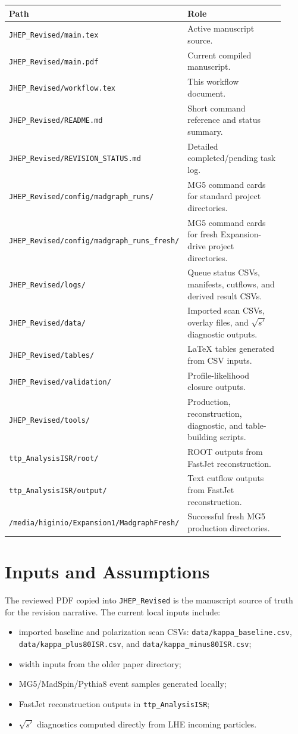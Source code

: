 \documentclass[11pt]{article}
\newcommand{\rev}{\texttt{JHEP\_Revised}}
\begin{document}
\begin{longtable}{@{}p{0.34\linewidth}p{0.58\linewidth}@{}}
\toprule
Path & Role \\
\midrule
\endhead
\texttt{JHEP\_Revised/main.tex} & Active manuscript source. \\
\texttt{JHEP\_Revised/main.pdf} & Current compiled manuscript. \\
\texttt{JHEP\_Revised/workflow.tex} & This workflow document. \\
\texttt{JHEP\_Revised/README.md} & Short command reference and status summary. \\
\texttt{JHEP\_Revised/REVISION\_STATUS.md} & Detailed completed/pending task log. \\
\texttt{JHEP\_Revised/config/madgraph\_runs/} & MG5 command cards for standard project directories. \\
\texttt{JHEP\_Revised/config/madgraph\_runs\_fresh/} & MG5 command cards for fresh Expansion-drive project directories. \\
\texttt{JHEP\_Revised/logs/} & Queue status CSVs, manifests, cutflows, and derived result CSVs. \\
\texttt{JHEP\_Revised/data/} & Imported scan CSVs, overlay files, and $\sqrt{s'}$ diagnostic outputs. \\
\texttt{JHEP\_Revised/tables/} & LaTeX tables generated from CSV inputs. \\
\texttt{JHEP\_Revised/validation/} & Profile-likelihood closure outputs. \\
\texttt{JHEP\_Revised/tools/} & Production, reconstruction, diagnostic, and table-building scripts. \\
\texttt{ttp\_AnalysisISR/root/} & ROOT outputs from FastJet reconstruction. \\
\texttt{ttp\_AnalysisISR/output/} & Text cutflow outputs from FastJet reconstruction. \\
\texttt{/media/higinio/Expansion1/MadgraphFresh/} & Successful fresh MG5 production directories. \\
\bottomrule
\end{longtable}

\section{Inputs and Assumptions}

The reviewed PDF copied into \rev{} is the manuscript source of truth for the
revision narrative.  The current local inputs include:
\begin{itemize}
  \item imported baseline and polarization scan CSVs:
        \texttt{data/kappa\_baseline.csv},
        \texttt{data/kappa\_plus80ISR.csv}, and
        \texttt{data/kappa\_minus80ISR.csv};
  \item width inputs from the older paper directory;
  \item MG5/MadSpin/Pythia8 event samples generated locally;
  \item FastJet reconstruction outputs in \texttt{ttp\_AnalysisISR};
  \item $\sqrt{s'}$ diagnostics computed directly from LHE incoming particles.
\end{itemize}
\end{document}

